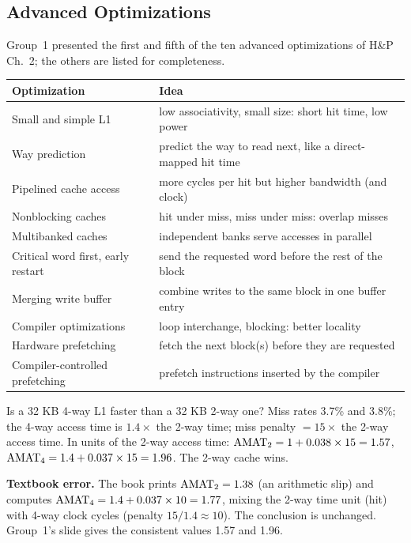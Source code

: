 \subsection{Advanced Optimizations}
\label{sec:advanced-opt}
\beyond{} Group~1 presented the first and fifth of the ten advanced optimizations
of H\&P Ch.~2; the others are listed for completeness.
\begin{center}
\small
\begin{tabular}{@{}P{5.2cm}P{8.6cm}@{}}
\toprule
Optimization & Idea \\
\midrule
Small and simple L1 & low associativity, small size: short hit time, low power \\
Way prediction & predict the way to read next, like a direct-mapped hit time \\
Pipelined cache access & more cycles per hit but higher bandwidth (and clock) \\
Nonblocking caches & hit under miss, miss under miss: overlap misses \\
Multibanked caches & independent banks serve accesses in parallel \\
Critical word first, early restart & send the requested word before the rest of the block \\
Merging write buffer & combine writes to the same block in one buffer entry \\
Compiler optimizations & loop interchange, blocking: better locality \\
Hardware prefetching & fetch the next block(s) before they are requested \\
Compiler-controlled prefetching & prefetch instructions inserted by the compiler \\
\bottomrule
\end{tabular}
\end{center}

\begin{eg}
Is a 32 KB 4-way L1 faster than a 32 KB 2-way one? Miss rates 3.7\% and 3.8\%;
the 4-way access time is $1.4\times$ the 2-way time; miss penalty $=15\times$ the
2-way access time. In units of the 2-way access time:
$\mathrm{AMAT}_{2}=1+0.038\times15=1.57$, $\mathrm{AMAT}_{4}=1.4+0.037\times15=1.96$. The 2-way
cache wins.
\end{eg}
\begin{remark}
\textbf{Textbook error.} The book prints $\mathrm{AMAT}_2=1.38$ (an arithmetic slip) and
computes $\mathrm{AMAT}_4=1.4+0.037\times10=1.77$, mixing the 2-way time unit (hit) with
4-way clock cycles (penalty $15/1.4\approx10$). The conclusion is unchanged.
Group~1's slide gives the consistent values 1.57 and 1.96.
\end{remark}

